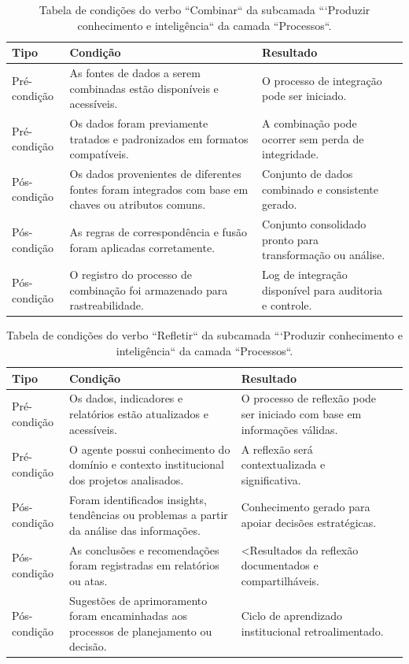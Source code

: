 \begin{apendicesenv}
\begin{table}[H]
\centering
\caption{Tabela de condições do verbo ``Combinar`` da subcamada ```Produzir conhecimento e inteligência`` da camada ``Processos``.}
\begin{tabularx}{\textwidth}{|l|X|X|X|}
\hline
\textbf{Tipo} & \textbf{Condição} & \textbf{Resultado} \\ \hline
Pré-condição & As fontes de dados a serem combinadas estão disponíveis e acessíveis. & O processo de integração pode ser iniciado.\\ \hline
Pré-condição & Os dados foram previamente tratados e padronizados em formatos compatíveis. & A combinação pode ocorrer sem perda de integridade.\\ \hline
Pós-condição & Os dados provenientes de diferentes fontes foram integrados com base em chaves ou atributos comuns. & Conjunto de dados combinado e consistente gerado.\\ \hline
Pós-condição & As regras de correspondência e fusão foram aplicadas corretamente. & Conjunto consolidado pronto para transformação ou análise.\\ \hline
Pós-condição & O registro do processo de combinação foi armazenado para rastreabilidade. & Log de integração disponível para auditoria e controle.\\ \hline
\end{tabularx}
\end{table}

\begin{table}[H]
\centering
\caption{Tabela de condições do verbo ``Refletir`` da subcamada ```Produzir conhecimento e inteligência`` da camada ``Processos``.}
\begin{tabularx}{\textwidth}{|l|X|X|X|}
\hline
\textbf{Tipo} & \textbf{Condição} & \textbf{Resultado} \\ \hline
Pré-condição & Os dados, indicadores e relatórios estão atualizados e acessíveis. & O processo de reflexão pode ser iniciado com base em informações válidas.\\ \hline
Pré-condição & O agente possui conhecimento do domínio e contexto institucional dos projetos analisados. & A reflexão será contextualizada e significativa.\\ \hline
Pós-condição & Foram identificados insights, tendências ou problemas a partir da análise das informações. & Conhecimento gerado para apoiar decisões estratégicas.\\ \hline
Pós-condição & As conclusões e recomendações foram registradas em relatórios ou atas. & <Resultados da reflexão documentados e compartilháveis.\\ \hline
Pós-condição & Sugestões de aprimoramento foram encaminhadas aos processos de planejamento ou decisão. & Ciclo de aprendizado institucional retroalimentado.\\ \hline
\end{tabularx}
\end{table}


\end{apendicesenv}
